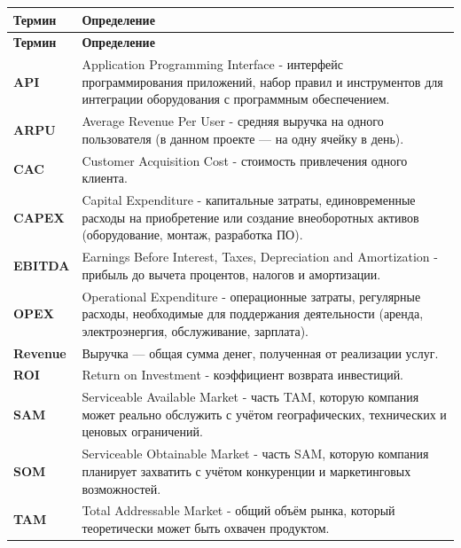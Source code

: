 \documentclass[12pt,a4paper]{article}
\begin{document}
\begin{longtable}{@{}p{}p{}@{}}
\toprule
\textbf{Термин} & \textbf{Определение} \\
\midrule
\endfirsthead
\toprule
\textbf{Термин} & \textbf{Определение} \\
\midrule
\endhead
\bottomrule
\endfoot

\textbf{API} & 
Application Programming Interface - интерфейс программирования приложений, набор правил и инструментов для интеграции оборудования с программным обеспечением. \\
\midrule

\textbf{ARPU} & 
Average Revenue Per User - средняя выручка на одного пользователя (в данном проекте — на одну ячейку в день). \\
\midrule

\textbf{CAC} & 
Customer Acquisition Cost - стоимость привлечения одного клиента. \\
\midrule

\textbf{CAPEX} & 
Capital Expenditure - капитальные затраты, единовременные расходы на приобретение или создание внеоборотных активов (оборудование, монтаж, разработка ПО). \\
\midrule

\textbf{EBITDA} & 
Earnings Before Interest, Taxes, Depreciation and Amortization - прибыль до вычета процентов, налогов и амортизации. \\
\midrule

\textbf{OPEX} & 
Operational Expenditure - операционные затраты, регулярные расходы, необходимые для поддержания деятельности (аренда, электроэнергия, обслуживание, зарплата). \\
\midrule

\textbf{Revenue} & 
Выручка — общая сумма денег, полученная от реализации услуг. \\
\midrule

\textbf{ROI} & 
Return on Investment - коэффициент возврата инвестиций. \\
\midrule

\textbf{SAM} & 
Serviceable Available Market - часть TAM, которую компания может реально обслужить с учётом географических, технических и ценовых ограничений. \\
\midrule

\textbf{SOM} & 
Serviceable Obtainable Market - часть SAM, которую компания планирует захватить с учётом конкуренции и маркетинговых возможностей. \\
\midrule

\textbf{TAM} & 
Total Addressable Market - общий объём рынка, который теоретически может быть охвачен продуктом.\\
\midrule

\end{longtable}
\end{document}
